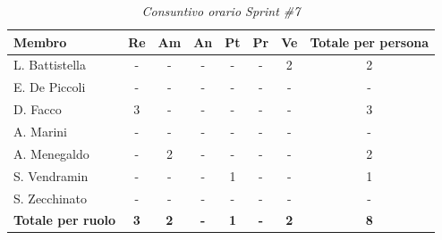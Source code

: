 ﻿\documentclass[a4paper, 10pt, colorlinks=true, linkcolor=black, urlcolor=blue, citecolor=blue, hidelinks]{article}
\renewcommand{\arraystretch}{1.2}
\begin{document}
\begin{table}[H]
    \centering
    \renewcommand{\arraystretch}{1.4}
    \begin{tabular}{|l|c|c|c|c|c|c|c|}
        \hline
        \rowcolor{bluBitless!15}
        \textbf{Membro} & \textbf{Re} & \textbf{Am} & \textbf{An} & \textbf{Pt} & \textbf{Pr} & \textbf{Ve} & \textbf{Totale per persona} \\
        \hline
        L. Battistella & - & - & - & - & - & 2 & 2 \\ \hline
        E. De Piccoli & - & - & - & - & - & - & - \\ \hline
        D. Facco & 3 & - & - & - & - & - & 3 \\ \hline
        A. Marini & - & - & - & - & - & - & - \\ \hline
        A. Menegaldo & - & 2 & - & - & - & - & 2 \\ \hline
        S. Vendramin & - & - & - & 1 & - & - & 1 \\ \hline
        S. Zecchinato & - & - & - & - & - & - & - \\ \hline
        \rowcolor{bluBitless!8}
        \textbf{Totale per ruolo} & \textbf{3} & \textbf{2} & \textbf{-} & \textbf{1} & \textbf{-} & \textbf{2} & \textbf{8} \\
        \hline
    \end{tabular}
    \caption{\textit{Consuntivo orario Sprint \#7}}
\end{table}
\end{document}
